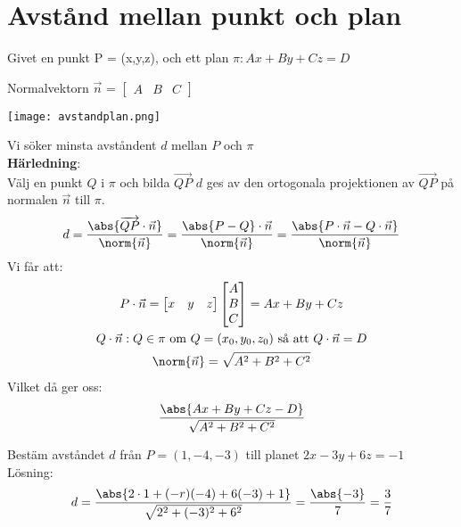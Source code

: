 \section{Avstånd mellan punkt och plan} %
\label{sec:avst_nd}
Givet en punkt P = (x,y,z), och ett plan $\pi : Ax + By + Cz =D$
\begin{Rem}
    Normalvektorn $\vec{n}$ = $\begin{bmatrix} A&B&C \end{bmatrix}$
\end{Rem}
\begin{center}
	\texttt{[image: avstandplan.png]}
\end{center}
Vi söker minsta avståndent $d$ mellan $P$ och $\pi$\\
\textbf{Härledning}:\\
Välj en punkt $Q$ i $\pi$ och bilda $\overrightarrow{QP}$ $d$ ges av den ortogonala projektionen av $\overrightarrow{QP}$ på normalen $\vec{n}$ till $\pi$.
\begin{gather*}
 	d = \frac{\abs{\overrightarrow{QP} \cdot \vec{n}}}{\norm{\vec{n}}} = \frac{\abs{P - Q} \cdot \vec{n}}{\norm{\vec{n}}} = \frac{\abs{P \cdot \vec{n} - Q \cdot \vec{n}}}{\norm{\vec{n}}}
 \end{gather*}
 Vi får att:
 \begin{gather*}
 	P \cdot \vec{n} = \begin{bmatrix} x&y&z \end{bmatrix} \begin{bmatrix} A\\B\\C \end{bmatrix} = Ax + By + Cz \\
 	Q \cdot \vec{n}: Q \in \pi \mbox{ om } Q = (x_0,y_0,z_0) \mbox{ så att } Q \cdot \vec{n} = D\\
 	\norm{\vec{n}} = \sqrt{A^2+B^2+C^2}
 \end{gather*}
 Vilket då ger oss:
 \[
     \frac{\abs{Ax+By+Cz-D}}{\sqrt{A^2+B^2+C^2}}
 \]
\begin{Ex}
    Bestäm avståndet $d$ från $P=(1,-4,-3)$ till planet $2x-3y+6z=-1$\\
    Lösning:
    \[
        d = \frac{\abs{2 \cdot 1 + (-r)(-4) + 6(-3) + 1}}{\sqrt{2^2 + (-3)^2 + 6^2}} = \frac{\abs{-3}}{7} = \frac{3}{7}
    \]
\end{Ex}
\newpage
